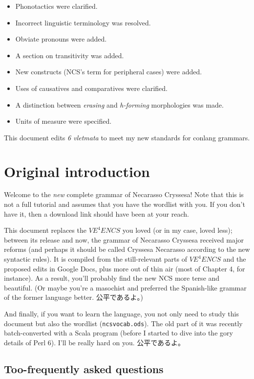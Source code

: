 \documentclass{book}
\begin{document}
\begin{itemize}
  \item Phonotactics were clarified.
  \item Incorrect linguistic terminology was resolved.
  \item Obviate pronouns were added.
  \item A section on transitivity was added.
  \item New constructs (NCS's term for peripheral cases) were added.
  \item Uses of causatives and comparatives were clarified.
  \item A distinction between \emph{erasing} and \emph{h-forming} morphologies was made.
  \item Units of measure were specified.
\end{itemize}

This document edits \emph{6 vletmata} to meet my new standards for conlang grammars.

\section{Original introduction}

Welcome to the \emph{new} complete grammar of Necarasso Cryssesa! Note that this is not a full tutorial and assumes that you have the wordlist with you. If you don't have it, then a download link should have been at your reach.

This document replaces the $VE^4ENCS$ you loved (or in my case, loved less); between its release and now, the grammar of Necarasso Cryssesa received major reforms (and perhaps it should be called Cryssesa Necarasso according to the new syntactic rules). It is compiled from the still-relevant parts of $VE^4ENCS$ and the proposed edits in Google Docs, plus more out of thin air (most of Chapter 4, for instance). As a result, you'll probably find the new NCS more terse and beautiful. (Or maybe you're a masochist and preferred the Spanish-like grammar of the former language better. \textsf{公平であるよ。})

And finally, if you want to learn the language, you not only need to study this document but also the wordlist (\texttt{ncsvocab.ods}). The old part of it was recently batch-converted with a Scala program (before I started to dive into the gory details of Perl 6). I'll be really hard on you. \textsf{公平であるよ。}

\subsection{Too-frequently asked questions}
\end{document}
